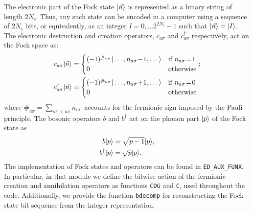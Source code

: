 \documentclass[edipack_sp.tex]{subfiles}
\begin{document}
The electronic part of the Fock state $|\vec{n}\rangle$ is represented
as a binary string of length $2N_\mathrm{s}$. Thus, any such state can be encoded
in a computer using a sequence of $2N_\mathrm{s}$ bits, or equivalently, as an integer $I=0,\dots 2^{2N_\mathrm{s}}-1$ such that $|\vec{n}\rangle=|I\rangle$.  
The electronic destruction and creation operators, $c_{a\sigma}$ and $c^\dagger_{a\sigma}$ 
respectively, act on the Fock space as:
\begin{align*}
  c_{a\sigma}\ket{\vec{n}} &=
    \begin{cases}
      (-1)^{\#_{a\sigma}}\ket{\dots,n_{a\sigma}\!-\!1,\dots}
      &\text{if $n_{a\sigma}\!=\! 1$}\\
      0 &\text{otherwise}
    \end{cases};\\
    c^\dagger_{a\sigma}\ket{\vec{n}} &=
     \begin{cases}
      (-1)^{\#_{a\sigma}}\ket{\dots,n_{a\sigma}\!+\!1,\dots}
      & \text{if $n_{a\sigma}\!=\! 0$}\\
      0 & \text{otherwise}
    \end{cases}    
\end{align*}
where $\#_{a\sigma}=\sum_{i\sigma'<a\sigma} n_{i\sigma'}$ accounts for the fermionic sign imposed by the Pauli principle.
The bosonic operators $b$ and $b^\dagger$ act on the phonon part $|p\rangle$ of the Fock state as
\begin{align*}
  b|p\rangle &= \sqrt{p-1}|p\rangle, \\
  b^\dagger|p\rangle &= \sqrt{p}|p\rangle.
\end{align*}
The implementation of Fock states and operators can be found in 
{\tt ED\_AUX\_FUNX}. In particular, in that module we define the bitwise action 
of the fermionic creation and annihilation operators as functions 
{\tt CDG} and {\tt C}, used throughout the code. 
Additionally, 
we provide the function {\tt bdecomp} for reconstructing the Fock  state bit sequence from the integer representation. 


\end{document}
